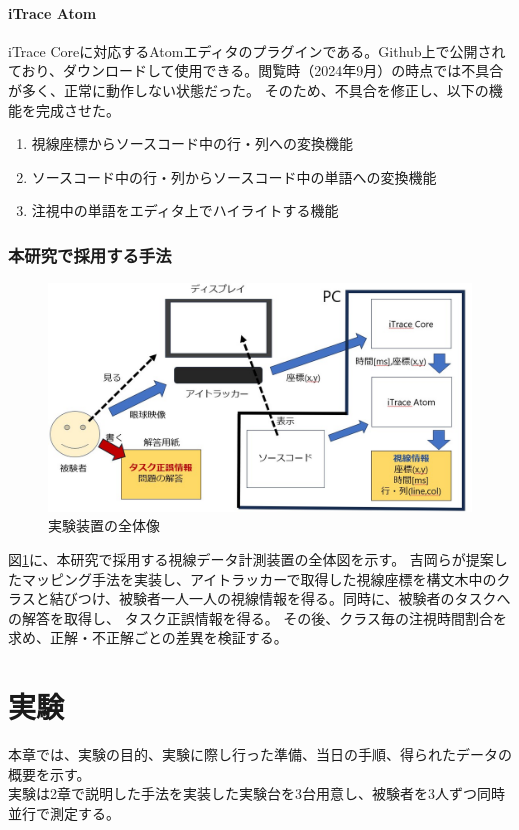 \documentclass[paper=a4paper,fontsize=11pt]{jlreq}
\begin{document}
    \subsection{iTrace Atom}
      iTrace Coreに対応するAtomエディタのプラグインである。Github上で公開されており、ダウンロードして使用できる。閲覧時（2024年9月）の時点では不具合が多く、正常に動作しない状態だった。
      そのため、不具合を修正し、以下の機能を完成させた。
      \begin{enumerate}
        \item 視線座標からソースコード中の行・列への変換機能
        \item ソースコード中の行・列からソースコード中の単語への変換機能
        \item 注視中の単語をエディタ上でハイライトする機能
      \end{enumerate}
  \clearpage

  \section{本研究で採用する手法}
    \begin{figure}[htbp]
      \centering
      \includegraphics[width=0.8\linewidth]{実験装置全体図.jpg}
      \caption{実験装置の全体像}
      \label{実験装置全体図}
    \end{figure}
    \FloatBarrier

    図\ref{実験装置全体図}に、本研究で採用する視線データ計測装置の全体図を示す。
    吉岡らが提案したマッピング手法を実装し、アイトラッカーで取得した視線座標を構文木中のクラスと結びつけ、被験者一人一人の視線情報を得る。同時に、被験者のタスクへの解答を取得し、
    タスク正誤情報を得る。
    その後、クラス毎の注視時間割合を求め、正解・不正解ごとの差異を検証する。
  \clearpage

\part{実験}
  本章では、実験の目的、実験に際し行った準備、当日の手順、得られたデータの概要を示す。\\
  実験は2章で説明した手法を実装した実験台を3台用意し、被験者を3人ずつ同時並行で測定する。
\end{document}
